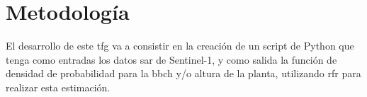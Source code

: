 
\chapter{Metodología}
\label{metodologia}
\par El desarrollo de este \gls{tfg} va a consistir en la creación de un script de Python que tenga como entradas los datos \gls{sar} de Sentinel-1, y como salida la función de densidad de probabilidad para la \gls{bbch} y/o altura de la planta, utilizando \gls{rfr} para realizar esta estimación. 
